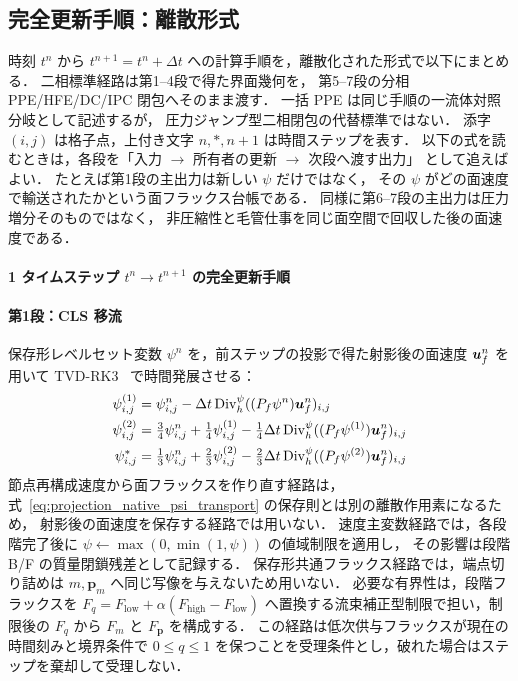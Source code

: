 \subsection{完全更新手順：離散形式}
\label{sec:algo_flow}

時刻 $t^n$ から $t^{n+1} = t^n + \Delta t$ への計算手順を，離散化された形式で以下にまとめる．
二相標準経路は第1--4段で得た界面幾何を，
第5--7段の分相 PPE/HFE/DC/IPC 閉包へそのまま渡す．
一括 PPE は同じ手順の一流体対照分岐として記述するが，
圧力ジャンプ型二相閉包の代替標準ではない．
添字 $(i,j)$ は格子点，上付き文字 $n, *, n+1$ は時間ステップを表す．
以下の式を読むときは，各段を「入力 $\to$ 所有者の更新 $\to$ 次段へ渡す出力」
として追えばよい．
たとえば第1段の主出力は新しい $\psi$ だけではなく，
その $\psi$ がどの面速度で輸送されたかという面フラックス台帳である．
同様に第6--7段の主出力は圧力増分そのものではなく，
非圧縮性と毛管仕事を同じ面空間で回収した後の面速度である．

\label{alg:full_timestep}
\paragraph{1 タイムステップ $t^n \to t^{n+1}$ の完全更新手順}

\paragraph{第1段：CLS 移流}
保存形レベルセット変数 $\psi^n$ を，前ステップの投影で得た射影後の面速度 $\bm{u}_f^n$ を用いて
TVD-RK3~\cite{ShuOsher1988} で時間発展させる：
\begin{align*}
  \psi^{(1)}_{i,j} &= \psi^n_{i,j} - \Delta t \, \mathrm{Div}_h^{\psi}((P_f\psi^n)\bm{u}_f^n)_{i,j} \\
  \psi^{(2)}_{i,j} &= \tfrac{3}{4}\psi^n_{i,j} + \tfrac{1}{4}\psi^{(1)}_{i,j} - \tfrac{1}{4}\Delta t \, \mathrm{Div}_h^{\psi}((P_f\psi^{(1)})\bm{u}_f^n)_{i,j} \\
  \psi^*_{i,j} &= \tfrac{1}{3}\psi^n_{i,j} + \tfrac{2}{3}\psi^{(2)}_{i,j} - \tfrac{2}{3}\Delta t \, \mathrm{Div}_h^{\psi}((P_f\psi^{(2)})\bm{u}_f^n)_{i,j}
\end{align*}
節点再構成速度から面フラックスを作り直す経路は，
式~\eqref{eq:projection_native_psi_transport} の保存則とは別の離散作用素になるため，
射影後の面速度を保存する経路では用いない．
速度主変数経路では，各段階完了後に
$\psi \leftarrow \max(0,\min(1,\psi))$ の値域制限を適用し，
その影響は段階 B/F の質量閉鎖残差として記録する．
保存形共通フラックス経路では，端点切り詰めは $m,\bm{p}_m$ へ同じ写像を与えないため用いない．
必要な有界性は，段階フラックスを
$F_q=F_{\mathrm{low}}+\alpha(F_{\mathrm{high}}-F_{\mathrm{low}})$
へ置換する流束補正型制限で担い，制限後の $F_q$ から
$F_m$ と $F_{\bm{p}}$ を構成する．
この経路は低次供与フラックスが現在の時間刻みと境界条件で
$0\le q\le1$ を保つことを受理条件とし，破れた場合はステップを棄却して受理しない．

